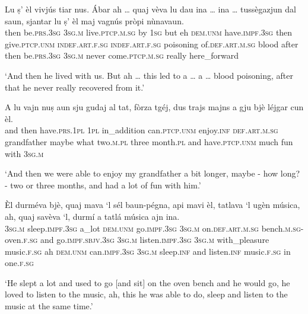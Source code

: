 \begin{linenumbers}
\gll Lu ṣ' èl vivjús tiar nus. Ábar ah … quaj vèva lu dau ina … ina … tussègazjun dal saun, sjantar lu ṣ’ èl maj vagnús pròpi nùnavaun.   \\
then be.\textsc{prs.3sg} \textsc{3sg.m} live.\textsc{ptcp.m.sg} by \textsc{1sg} but eh {} \textsc{dem.unm}  have.\textsc{impf.3sg} then give.\textsc{ptcp.unm} {} \textsc{indef.art.f.sg} \textsc{indef.art.f.sg} {} poisoning of.\textsc{def.art.m.sg} blood after then be.\textsc{prs.3sg} \textsc{3sg.m} never come.\textsc{ptcp.m.sg} really here\_forward \\
\end{linenumbers}
\medskip
\glt `And then he lived with us. But ah … this led to a … a … blood poisoning, after that he never really recovered  from it.'
\medskip

\begin{linenumbers}
\gll  A lu vajn nuṣ aun sju gudaj al tat, fòrza tgéj, dus trajs majns a gju bjè léjgar cun èl.\\
and then have.\textsc{prs.1pl} \textsc{1pl} in\_addition can.\textsc{ptcp.unm} enjoy.\textsc{inf}  \textsc{def.art.m.sg} grandfather maybe what two.\textsc{m.pl} three month.\textsc{pl} and have.\textsc{ptcp.unm} much fun with \textsc{3sg.m} \\
\end{linenumbers}
\medskip
\glt `And then we were able to enjoy my grandfather a bit longer, maybe - how long? - two or three months, and had a lot of fun with him.'
\medskip

\begin{linenumbers}
\gll  Èl durméva bjè, quaj mava `l sél baun-pégna, api mavi èl, tatlava `l ugèn música, ah, quaj savèva `l, durmí a tatlá música ajn ina.\\
 \textsc{3sg.m} sleep.\textsc{impf.3sg} a\_lot \textsc{dem.unm} go.\textsc{impf.3sg} \textsc{3sg.m} on.\textsc{def.art.m.sg} bench.\textsc{m.sg}-oven.\textsc{f.sg} and go.\textsc{impf.sbjv.3sg} \textsc{3sg.m} listen.\textsc{impf.3sg} \textsc{3sg.m} with\_pleasure music.\textsc{f.sg} ah \textsc{dem.unm} can.\textsc{impf.3sg} \textsc{3sg.m} sleep.\textsc{inf} and listen.\textsc{inf} music.\textsc{f.sg} in one.\textsc{f.sg}  \\
\end{linenumbers}
\medskip
\glt `He slept a lot and used to go [and sit] on the oven bench and he would go, he loved to listen to the music, ah, this he was able to do, sleep and listen to the music at the same time.'
\medskip

